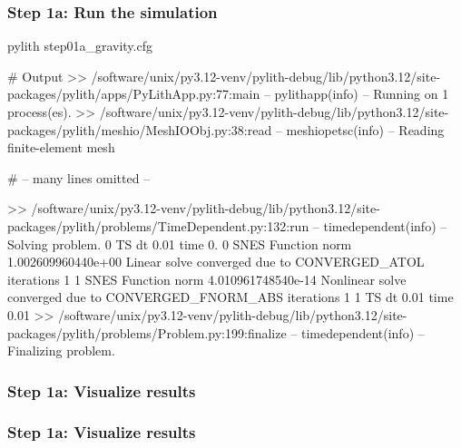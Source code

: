 \documentclass[aspectratio=169]{beamer}
\begin{document}
\begin{frame}[fragile]
  \frametitle{Step 1a: Run the simulation}
  \summary{}

\begin{bashcode}
pylith step01a_gravity.cfg

# Output
 >> /software/unix/py3.12-venv/pylith-debug/lib/python3.12/site-packages/pylith/apps/PyLithApp.py:77:main
 -- pylithapp(info)
 -- Running on 1 process(es).
 >> /software/unix/py3.12-venv/pylith-debug/lib/python3.12/site-packages/pylith/meshio/MeshIOObj.py:38:read
 -- meshiopetsc(info)
 -- Reading finite-element mesh

# -- many lines omitted --

 >> /software/unix/py3.12-venv/pylith-debug/lib/python3.12/site-packages/pylith/problems/TimeDependent.py:132:run
 -- timedependent(info)
 -- Solving problem.
0 TS dt 0.01 time 0.
    0 SNES Function norm 1.002609960440e+00
      Linear solve converged due to CONVERGED_ATOL iterations 1
    1 SNES Function norm 4.010961748540e-14
    Nonlinear solve converged due to CONVERGED_FNORM_ABS iterations 1
1 TS dt 0.01 time 0.01
 >> /software/unix/py3.12-venv/pylith-debug/lib/python3.12/site-packages/pylith/problems/Problem.py:199:finalize
 -- timedependent(info)
 -- Finalizing problem.
\end{bashcode}
  
\end{frame}



\begin{frame}
  \frametitle{Step 1a: Visualize results}

    
\end{frame}


\begin{frame}
  \frametitle{Step 1a: Visualize results}

    
\end{frame}
\end{document}
